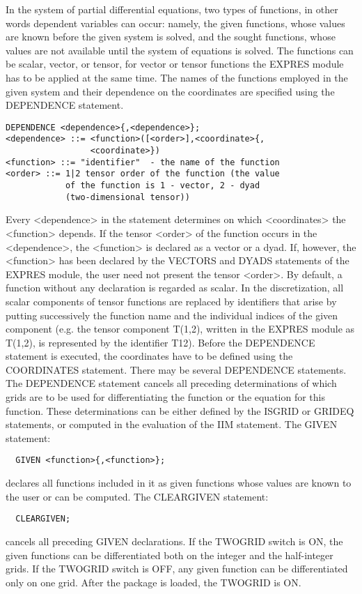      In  the  system  of  partial  differential  equations, two types of
functions, in other words dependent  variables  can  occur:  namely, the
given  functions,  whose  values  are  known  before the given system is
solved, and the sought functions, whose  values are  not available until
the system  of equations is solved. The functions can be scalar, vector,
or tensor, for vector or tensor  functions the  EXPRES module  has to be
applied at  the same  time. The  names of  the functions employed in the
given system and their dependence on the coordinates are specified using
the DEPENDENCE statement.
\begin{verbatim}
DEPENDENCE <dependence>{,<dependence>};
<dependence> ::= <function>([<order>],<coordinate>{,
                 <coordinate>})
<function> ::= "identifier"  - the name of the function
<order> ::= 1|2 tensor order of the function (the value
            of the function is 1 - vector, 2 - dyad
            (two-dimensional tensor))
\end{verbatim}
Every <dependence>  in the  statement determines  on which <coordinates>
the <function> depends. If the tensor <order> of the function  occurs in
the <dependence>,  the <function> is declared as a vector or a dyad. If,
however, the <function> has  been  declared  by  the  VECTORS  and DYADS
statements of  the EXPRES  module, the  user need not present the tensor
<order>. By default, a function without  any declaration  is regarded as
scalar. In the discretization, all scalar components of tensor functions
are replaced by  identifiers  that  arise  by  putting  successively the
function name  and the  individual indices  of the given component (e.g.
the tensor component T(1,2), written in the EXPRES module as  T(1,2), is
represented by  the identifier  T12). Before the DEPENDENCE statement is
executed, the coordinates  have  to  be  defined  using  the COORDINATES
statement. There  may be  several DEPENDENCE  statements. The DEPENDENCE
statement cancels all preceding determinations of which grids  are to be
used for differentiating the function or the equation for this function.
These determinations can be  either  defined  by  the  ISGRID  or GRIDEQ
statements, or computed in the evaluation of the IIM statement.
     The GIVEN statement:
\begin{verbatim}
  GIVEN <function>{,<function>};
\end{verbatim}
declares all  functions included  in it  as given functions whose values
are known to the user or can be computed. The CLEARGIVEN statement:
\begin{verbatim}
  CLEARGIVEN;
\end{verbatim}
cancels all preceding GIVEN declarations. If  the TWOGRID  switch is ON,
the given  functions can  be differentiated  both on the integer and the
half-integer grids. If the TWOGRID switch is OFF, any given function can
be differentiated  only on  one grid.  After the  package is loaded, the
TWOGRID is ON.


